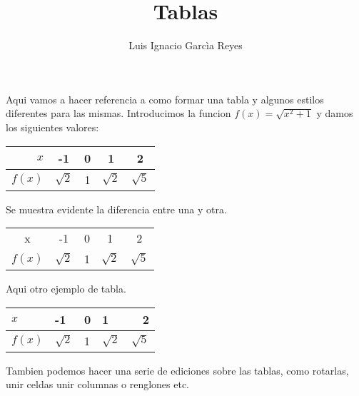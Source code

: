 \documentclass{article}
\begin{document}
\title{Tablas}
\author{Luis Ignacio Garcìa Reyes}
\maketitle
Aqui vamos a hacer referencia a como formar una tabla y algunos estilos diferentes para las mismas.\newline\newline
Introducimos la funcion $f(x)=\sqrt{x^2+1}$ y damos los siguientes valores:\newline\newline
\begin{center}
\begin{tabular}{r|cccc}

$x$ &-1&0&1&2\\
\hline
$f(x)$  &$\sqrt{2}$ &1& $\sqrt{2}$ & $\sqrt{5}$

\end{tabular}

\end{center}
Se muestra evidente la diferencia entre una y otra.
\begin{center}
\begin{tabular}{|c|c|c|c|c|} \hline
x&-1&0&1&2 \\ \cline{1-5}
$f(x)$&$\sqrt{2}$&1&$\sqrt{2}$&$\sqrt{5}$\\ \hline
\end{tabular}
\end{center}
	Aqui otro ejemplo de tabla.
\begin{center}
\begin{tabular}{llllr} \toprule
$x$ &-1&0&1&2 \\ \midrule
$f(x)$  &$\sqrt{2}$ &1& $\sqrt{2}$ & $\sqrt{5}$\\ \bottomrule
\end{tabular}
\end{center}
Tambien podemos hacer una serie de ediciones sobre las tablas, como rotarlas, unir celdas unir columnas o renglones etc.
\end{document}
